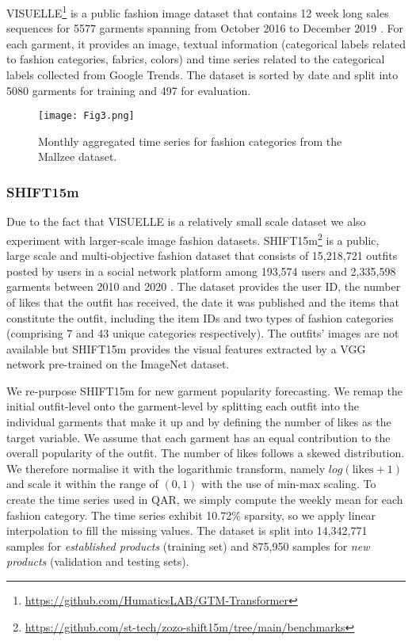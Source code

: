 \documentclass{article}
\begin{document}
VISUELLE\footnote{\url{https://github.com/HumaticsLAB/GTM-Transformer}} is a public fashion image dataset that contains 12 week long sales sequences for 5577 garments spanning from October 2016 to December 2019 \cite{skenderi2021well}. For each garment, it provides an image, textual information (categorical labels related to fashion categories, fabrics, colors) and time series related to the categorical labels collected from Google Trends. 
The dataset is sorted by date and split into 5080 garments for training and 497 for evaluation. 

\begin{figure*}[ht]
    \centering
    \texttt{[image: Fig3.png]}
    \caption{Monthly aggregated time series for fashion categories from the Mallzee dataset.}
    \label{fig:timeseries}
\end{figure*}

\subsubsection{\textbf{SHIFT15m}}

Due to the fact that VISUELLE is a relatively small scale dataset we also experiment with larger-scale image fashion datasets.
SHIFT15m\footnote{\url{https://github.com/st-tech/zozo-shift15m/tree/main/benchmarks}} is a public, large scale and multi-objective fashion dataset that consists of 15,218,721 outfits posted by users in a social network platform among 193,574 users and 2,335,598 garments between 2010 and 2020 \cite{kimura2021shift15m}. The dataset provides the user ID, the number of likes that the outfit has received, the date it was published and the items that constitute the outfit, including the item IDs and two types of fashion categories (comprising 7 and 43 unique categories respectively). The outfits' images are not available but SHIFT15m provides the visual features extracted by a VGG network pre-trained on the ImageNet dataset.

We re-purpose SHIFT15m for new garment popularity forecasting. We remap the initial outfit-level onto the garment-level by splitting each outfit into the individual garments that make it up and by defining the number of likes as the target variable. We assume that each garment has an equal contribution to the overall popularity of the outfit.
The number of likes follows a skewed distribution. We therefore normalise it with the logarithmic transform, namely $log(\text{likes} + 1)$ and scale it within the range of $(0, 1)$ with the use of min-max scaling. 
To create the time series used in QAR, we simply compute the weekly mean for each fashion category. The time series exhibit 10.72\% sparsity, so we apply linear interpolation to fill the missing values.
The dataset is split into 14,342,771 samples for \textit{established products} (training set) and 875,950 samples for \textit{new products} (validation and testing sets).
\end{document}

